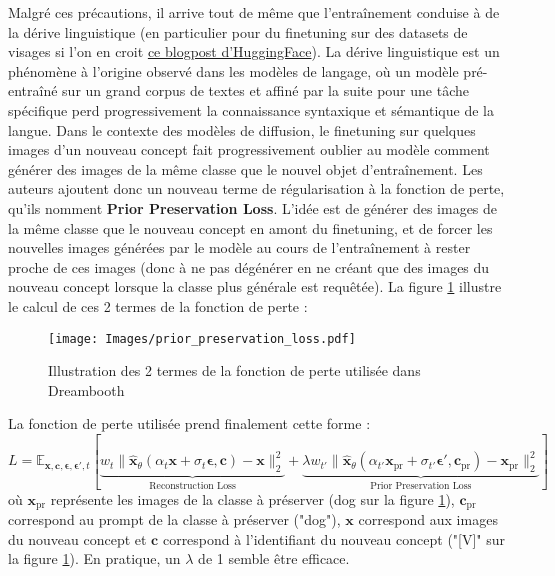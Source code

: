 \documentclass{article}
\begin{document}
Malgré ces précautions, il arrive tout de même que l'entraînement conduise à de la dérive linguistique (en particulier pour du finetuning sur des datasets de visages si l'on en croit \href{https://huggingface.co/blog/dreambooth#tldr-recommended-settings}{ce blogpost d'HuggingFace}). La dérive linguistique est un phénomène à l'origine observé dans les modèles de langage, où un modèle pré-entraîné sur un grand corpus de textes et affiné par la suite pour une tâche spécifique perd progressivement la connaissance syntaxique et sémantique de la langue. Dans le contexte des modèles de diffusion, le finetuning sur quelques images d'un nouveau concept fait progressivement oublier au modèle comment générer des images de la même classe que le nouvel objet d'entraînement. Les auteurs ajoutent donc un nouveau terme de régularisation à la fonction de perte, qu'ils nomment \textbf{Prior Preservation Loss}. L'idée est de générer des images de la même classe que le nouveau concept en amont du finetuning, et de forcer les nouvelles images générées par le modèle au cours de l'entraînement à rester proche de ces images (donc à ne pas dégénérer en ne créant que des images du nouveau concept lorsque la classe plus générale est requêtée). La figure \ref{losses_dreambooth} illustre le calcul de ces 2 termes de la fonction de perte :
\begin{figure}[H]
    \centering
    \texttt{[image: Images/prior\_preservation\_loss.pdf]}
    \caption{Illustration des 2 termes de la fonction de perte utilisée dans Dreambooth}
    \label{losses_dreambooth}
\end{figure}

La fonction de perte utilisée prend finalement cette forme :
\large
$$L = \mathbb{E}_{\textbf{x}, \textbf{c}, \boldsymbol{\epsilon}, \boldsymbol{\epsilon}', t} [\underbrace{w_t \lVert \hat{\textbf{x}}_{\theta}(\alpha_t \textbf{x} + \sigma_t  \boldsymbol{\epsilon},  \textbf{c}) - \textbf{x}\rVert_2^2}_{\text{Reconstruction Loss}} + \underbrace{\lambda w_{t'} \lVert \hat{\textbf{x}}_{\theta}(\alpha_{t'} \textbf{x}_{\text{pr}} + \sigma_{t'}  \boldsymbol{\epsilon}',  \textbf{c}_{\text{pr}}) - \textbf{x}_{\text{pr}}\rVert_2^2}_{\text{Prior Preservation Loss}}]$$
\normalsize
où $\textbf{x}_{\text{pr}}$ représente les images de la classe à préserver (dog sur la figure \ref{losses_dreambooth}), $\textbf{c}_{\text{pr}}$ correspond au prompt de la classe à préserver ("dog"), $\textbf{x}$ correspond aux images du nouveau concept et $\textbf{c}$ correspond à l'identifiant du nouveau concept ("[V]" sur la figure \ref{losses_dreambooth}). En pratique, un $\lambda$ de 1 semble être efficace.
\end{document}
